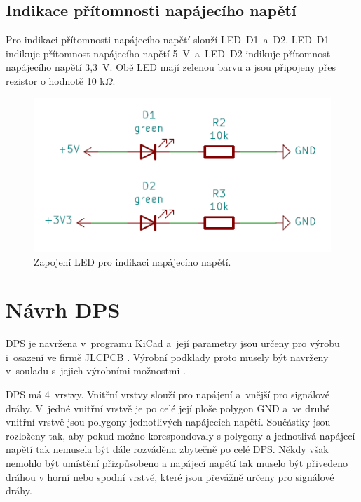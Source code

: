   \section{Indikace přítomnosti napájecího napětí}
  Pro indikaci přítomnosti napájecího napětí slouží LED~D1~a~D2. LED~D1 indikuje přítomnost napájecího napětí 
  5~V~a~LED~D2 indikuje přítomnost napájecího napětí 3,3~V. Obě LED mají zelenou barvu a jsou připojeny přes
  rezistor o hodnotě 10 k$\Omega$.

  \begin{figure}[!h]
    \begin{center}
      \includegraphics[scale=0.8]{obrazky/powerLED.png}
    \end{center}
    \caption[Zapojení LED pro indikaci napájecího napětí]{Zapojení LED pro indikaci napájecího napětí.}
  \end{figure}

  \chapter{Návrh DPS}
  DPS je navržena v~programu KiCad a~její parametry jsou určeny pro výrobu i~osazení ve firmě JLCPCB \cite{KiCad} \cite{JLCPCB}. Výrobní 
  podklady proto musely být navrženy v~souladu s~jejich výrobními možnostmi \cite{JLCPCB_Capabilities}.

  DPS má 4~vrstvy. Vnitřní vrstvy slouží pro napájení a~vnější pro signálové dráhy. V~jedné vnitřní vrstvě je po celé její ploše 
  polygon GND a~ve druhé vnitřní vrstvě jsou polygony jednotlivých napájecích napětí. Součástky jsou rozloženy tak, aby pokud možno
  korespondovaly s polygony a jednotlivá napájecí napětí tak nemusela být dále rozváděna zbytečně po celé DPS. Někdy však nemohlo být umístění 
  přizpůsobeno a napájecí napětí tak muselo být přivedeno dráhou v horní nebo spodní vrstvě, které jsou převážně určeny pro signálové 
  dráhy. 

